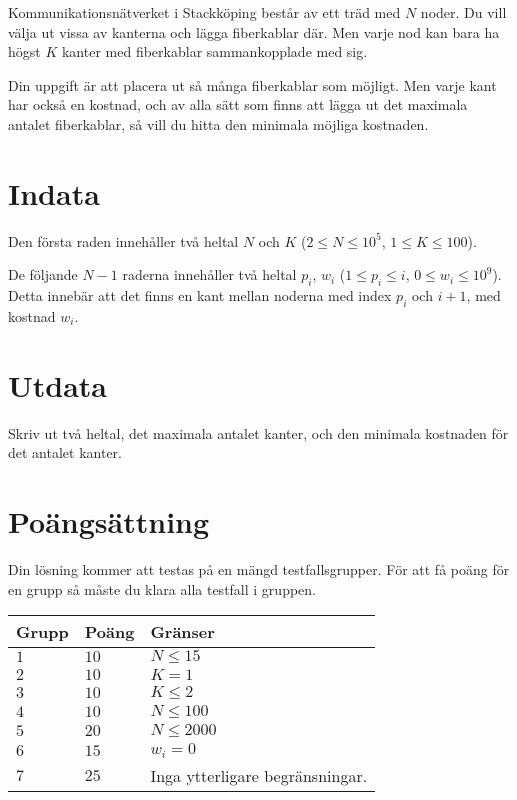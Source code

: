 
Kommunikationsnätverket i Stackköping består av ett träd med $N$ noder. Du vill välja ut vissa av
kanterna och lägga fiberkablar där. Men varje nod kan bara ha högst $K$ kanter med fiberkablar 
sammankopplade med sig. 

Din uppgift är att placera ut så många fiberkablar som möjligt. Men varje kant har också en kostnad,
och av alla sätt som finns att lägga ut det maximala antalet fiberkablar, så vill du hitta den
minimala möjliga kostnaden.

\section*{Indata}

Den första raden innehåller två heltal $N$ och $K$ ($2 \leq N \leq 10^5$, $1 \leq K \leq 100$).

De följande $N-1$ raderna innehåller två heltal $p_i$, $w_i$ ($1 \leq p_i \leq i$, $0 \leq w_i \leq 10^9$).
Detta innebär att det finns en kant mellan noderna med index $p_i$ och $i+1$, med kostnad $w_i$. 

\section*{Utdata}
Skriv ut två heltal, det maximala antalet kanter, och den minimala kostnaden för det antalet kanter.

\section*{Poängsättning}
Din lösning kommer att testas på en mängd testfallsgrupper.
För att få poäng för en grupp så måste du klara alla testfall i gruppen.

\noindent
\begin{tabular}{| l | l | p{12cm} |}
  \hline
  \textbf{Grupp} & \textbf{Poäng} & \textbf{Gränser} \\ \hline
  $1$   & $10$       & $N \leq 15$\\ \hline
  $2$   & $10$       & $K = 1$  \\ \hline
  $3$   & $10$       & $K \leq 2$ \\ \hline
  $4$   & $10$       & $N \leq 100$ \\ \hline
  $5$   & $20$       & $N \leq 2000$ \\ \hline
  $6$   & $15$       & $w_i = 0$ \\ \hline
  $7$   & $25$       & Inga ytterligare begränsningar. \\ \hline
\end{tabular}
